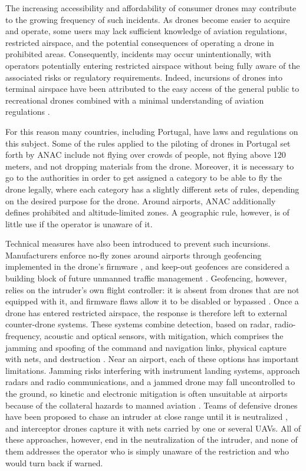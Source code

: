 The increasing accessibility and affordability of consumer drones may contribute to the growing frequency of such incidents. As drones become easier to acquire and operate, some users may lack sufficient knowledge of aviation regulations, restricted airspace, and the potential consequences of operating a drone in prohibited areas. Consequently, incidents may occur unintentionally, with operators potentially entering restricted airspace without being fully aware of the associated risks or regulatory requirements. Indeed, incursions of drones into terminal airspace have been attributed to the easy access of the general public to recreational drones combined with a minimal understanding of aviation regulations \cite{wang2019alert}.

For this reason many countries, including Portugal, have laws and regulations on this subject. Some of the rules applied to the piloting of drones in Portugal set forth by \gls{ANAC} include not flying over crowds of people, not flying above 120 meters, and not dropping materials from the drone. Moreover, it is necessary to go to the authorities in order to get assigned a category to be able to fly the drone legally, where each category has a slightly different sets of rules, depending on the desired purpose for the drone. Around airports, \gls{ANAC} additionally defines prohibited and altitude-limited zones. A geographic rule, however, is of little use if the operator is unaware of it.

Technical measures have also been introduced to prevent such incursions. Manufacturers enforce no-fly zones around airports through geofencing implemented in the drone's firmware \cite{schiller2023}, and keep-out geofences are considered a building block of future unmanned traffic management \cite{kim2022geofence}. Geofencing, however, relies on the intruder's own flight controller: it is absent from drones that are not equipped with it, and firmware flaws allow it to be disabled or bypassed \cite{schiller2023}. Once a drone has entered restricted airspace, the response is therefore left to external counter-drone systems. These systems combine detection, based on radar, radio-frequency, acoustic and optical sensors, with mitigation, which comprises the jamming and spoofing of the command and navigation links, physical capture with nets, and destruction \cite{wang2021cuas,kang2020,lykou2020}. Near an airport, each of these options has important limitations. Jamming risks interfering with instrument landing systems, approach radars and radio communications, and a jammed drone may fall uncontrolled to the ground, so kinetic and electronic mitigation is often unsuitable at airports because of the collateral hazards to manned aviation \cite{lykou2020}. Teams of defensive drones have been proposed to chase an intruder at close range until it is neutralized \cite{castrillo2022}, and interceptor drones capture it with nets carried by one \cite{pliska2024} or several \cite{wang2025net,rothe2025} \glspl{UAV}. All of these approaches, however, end in the neutralization of the intruder, and none of them addresses the operator who is simply unaware of the restriction and who would turn back if warned.


